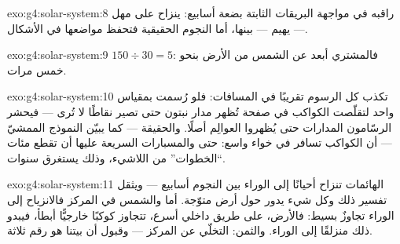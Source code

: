\begin{solution}{exo:g4:solar-system:8}
راقبه في مواجهة البريقات الثابتة بضعة أسابيع:  ينزاح على
مهل --- يهيم --- بينها، أما النجوم الحقيقية فتحفظ مواضعها في
الأشكال.
\end{solution}

\begin{solution}{exo:g4:solar-system:9}
$150 \div 30 = 5$: فالمشتري أبعد عن الشمس من الأرض بنحو خمس
مرات.
\end{solution}

\begin{solution}{exo:g4:solar-system:10}
تكذب كل الرسوم تقريبًا في المسافات: فلو رُسمت بمقياس واحد
لتقلّصت الكواكب في صفحة تُظهر مدار نبتون حتى تصير نقاطًا لا
تُرى --- فيحشر الرسّامون المدارات حتى يُظهروا العوالِم أصلًا.
والحقيقة --- كما يبيّن النموذج الممشيّ --- أن الكواكب تسافر في
خواء واسع: حتى  والمسبارات السريعة عليها أن تقطع مئات
``الخطوات'' من اللاشيء، وذلك يستغرق سنوات.
\end{solution}

\begin{solution}{exo:g4:solar-system:11}
الهائمات تنزاح أحيانًا إلى الوراء بين النجوم أسابيع --- ويثقل
تفسير ذلك وكل شيء يدور حول أرض متوّجة. أما والشمس في المركز
فالانزياح إلى الوراء تجاوزٌ بسيط: فالأرض، على طريق داخلي أسرع،
تتجاوز كوكبًا خارجيًّا أبطأ، فيبدو ذلك  منزلقًا إلى
الوراء. والثمن: التخلّي عن المركز --- وقبول أن بيتنا هو 
رقم ثلاثة.
\end{solution}
